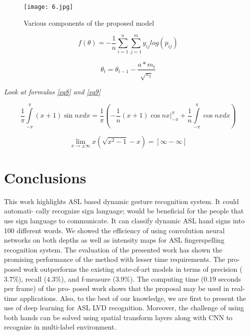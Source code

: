 \documentclass[
  manuscript=article,  %
  layout=preprint,  %
  year=20xx,
  volume=x,
]{joas}
\begin{document}
\begin{figure}[h!]
    \centering
    \texttt{[image: 6.jpg]}
    \caption{Various components of the proposed model}
    \label{f3}
\end{figure}


\begin{equation}
f(\theta)=-\frac{1}{n}\sum^n_{i=1}\sum^m_{j=1}y_{ij}log\left(p_{ij}\right)\label{eq6}
\end{equation}

\begin{equation}
    \theta_{t}=\theta_{t-1}-\frac{a*m_{t}}{\sqrt{v_{t}}}\label{eq7}
\end{equation}


\par {\Huge \emph{Look at formulas \ref{eq8} and \ref{eq9}}}

\begin{equation}
    \frac{1}{\pi}\int\limits_{-\pi}^{\pi}(x+1)\sin{nx}dx = \frac{1}{\pi}\left(-\frac{1}{n}(x+1)\cos{nx}\Big|_{-\pi}^{\pi}+\frac{1}{n}\int\limits_{-\pi}^{\pi}\cos{nx}dx\right) \label{eq8}
\end{equation}

\begin{equation}
    \lim_{x \to \pm\infty} x\left(\sqrt{x^2-1}-x\right) = [\infty - \infty] \label{eq9}
\end{equation}

\section{Conclusions}
This work highlights ASL based dynamic gesture recognition system. It could automati- cally recognize sign language; would be beneficial for the people that use sign language to communicate. It can classify dynamic ASL hand signs into 100 different words. We showed the efficiency of using convolution neural networks on both depths as well as intensity maps for ASL fingerspelling recognition system. The evaluation of the presented work has shown the promising performance of the method with lesser time requirements. The pro- posed work outperforms the existing state-of-art models in terms of precision ($3.7\%$), recall ($4.3\%$), and f-measure ($3.9\%$). The computing time (0.19 seconds per frame) of the pro- posed work shows that the proposal may be used in real-time applications. Also, to the best of our knowledge, we are first to present the use of deep learning for ASL LVD recognition. Moreover, the challenge of using both hands can be solved using spatial transform layers along with CNN to recognize in multi-label environment.
\end{document}
